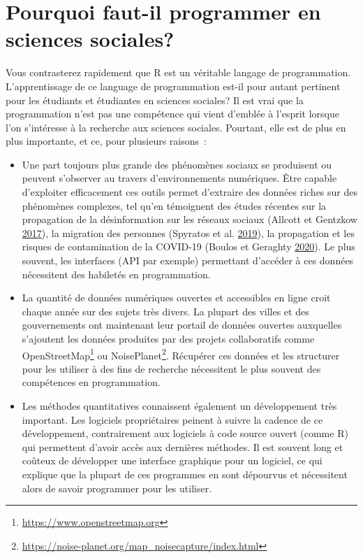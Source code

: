 \documentclass[
  11pt,
  french,
]{book}
\providecommand{\tightlist}{%
  \setlength{\itemsep}{0pt}\setlength{\parskip}{0pt}}
\renewcommand{\href}[2]{#2\footnote{\url{#1}}}
\begin{document}
\hypertarget{sect005}{%
\section*{Pourquoi faut-il programmer en sciences sociales?}\label{sect005}}

Vous contrasterez rapidement que R est un véritable langage de programmation. L'apprentissage de ce language de programmation est-il pour autant pertinent pour les étudiants et étudiantes en sciences sociales? Il est vrai que la programmation n'est pas une compétence qui vient d'emblée à l'esprit lorsque l'on s'intéresse à la recherche aux sciences sociales. Pourtant, elle est de plus en plus importante, et ce, pour plusieurs raisons~:

\begin{itemize}
\tightlist
\item
  Une part toujours plus grande des phénomènes sociaux se produisent ou peuvent s'observer au travers d'environnements numériques. Être capable d'exploiter efficacement ces outils permet d'extraire des données riches sur des phénomènes complexes, tel qu'en témoignent des études récentes sur la propagation de la désinformation sur les réseaux sociaux (Allcott et Gentzkow \protect\hyperlink{ref-allcott2017social}{2017}), la migration des personnes (Spyratos et al. \protect\hyperlink{ref-spyratos2019quantifying}{2019}), la propagation et les risques de contamination de la COVID-19 (Boulos et Geraghty \protect\hyperlink{ref-boulos2020geographical}{2020}). Le plus souvent, les interfaces (API par exemple) permettant d'accéder à ces données nécessitent des habiletés en programmation.
\item
  La quantité de données numériques ouvertes et accessibles en ligne croit chaque année sur des sujets très divers. La plupart des villes et des gouvernements ont maintenant leur portail de données ouvertes auxquelles s'ajoutent les données produites par des projets collaboratifs comme \href{https://www.openstreetmap.org}{OpenStreetMap} ou \href{https://noise-planet.org/map_noisecapture/index.html}{NoisePlanet}. Récupérer ces données et les structurer pour les utiliser à des fins de recherche nécessitent le plus souvent des compétences en programmation.
\item
  Les méthodes quantitatives connaissent également un développement très important. Les logiciels propriétaires peinent à suivre la cadence de ce développement, contrairement aux logiciels à code source ouvert (comme R) qui permettent d'avoir accès aux dernières méthodes. Il est souvent long et coûteux de développer une interface graphique pour un logiciel, ce qui explique que la plupart de ces programmes en sont dépourvus et nécessitent alors de savoir programmer pour les utiliser.

\end{itemize}
\end{document}
